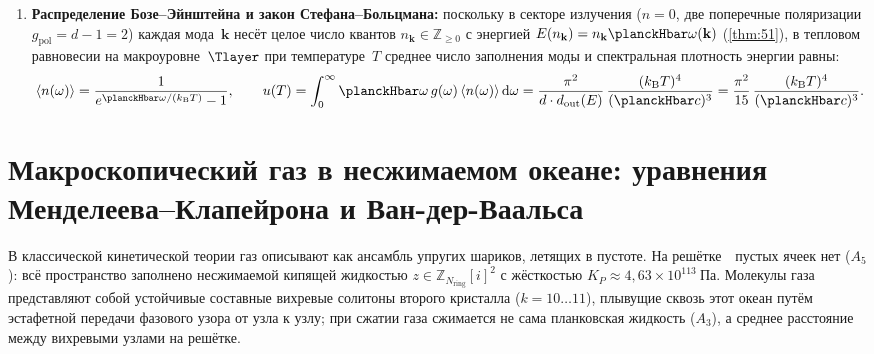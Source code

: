 \begin{theorem}
\begin{enumerate}[leftmargin=*]
  край зоны достигается \emph{в точности} при $\omega = \symPi/\htick$ и остаётся колеблющимся.
  Гиперболических мод ($|\cos\omega| > 1$) на этой звезде нет ни в одной точке зоны,
  что и снимает разгон, известный для декартовой сетки $\mathbb{Z}^d$ при $d>1$
  ().
\item \textbf{Распределение Бозе--Эйнштейна и закон Стефана--Больцмана:}
  поскольку в секторе излучения ($n=0$, две поперечные поляризации $g_{\mathrm{pol}} = d-1 = 2$) каждая мода~$\mathbf{k}$ несёт целое число квантов $n_{\mathbf{k}}\in\mathbb{Z}_{\ge 0}$ с энергией $E(n_{\mathbf{k}}) = n_{\mathbf{k}}\planckHbar\omega(\mathbf{k})$ (\cref{thm:51}), в тепловом равновесии на макроуровне~$\Tlayer$ при температуре~$T$ среднее число заполнения моды и спектральная плотность энергии равны:
  \[
    \langle n(\omega)\rangle = \frac{1}{e^{\planckHbar\omega/(k_{\mathrm{B}}T)} - 1},\qquad
    u(T) = \int_0^{\infty} \planckHbar\omega\,g(\omega)\,\langle n(\omega)\rangle\,\mathrm{d}\omega
    = \frac{\pi^2}{d\cdot d_{\mathrm{out}}(E)}\,\frac{(k_{\mathrm{B}}T)^4}{(\planckHbar c)^3}
    = \frac{\pi^2}{15}\,\frac{(k_{\mathrm{B}}T)^4}{(\planckHbar c)^3}.
  \]
\end{enumerate}
\end{theorem}

\section{Макроскопический газ в несжимаемом океане: уравнения Менделеева--Клапейрона и Ван-дер-Ваальса}
\label{sec:macro-gas-vdw}

В классической кинетической теории газ описывают как ансамбль упругих шариков, летящих в пустоте.
На решётке~\latGCKshort\ пустых ячеек нет ($A_5$): всё пространство заполнено несжимаемой кипящей жидкостью $z\in\mathbb{Z}_{N_{\mathrm{ring}}}[i]^2$ с жёсткостью $K_P \approx 4{,}63\times 10^{113}\ \mathrm{Па}$.
Молекулы газа представляют собой устойчивые составные вихревые солитоны второго кристалла ($k=10\ldots 11$), плывущие сквозь этот океан путём эстафетной передачи фазового узора от узла к узлу; при сжатии газа сжимается не сама планковская жидкость ($A_3$), а среднее расстояние между вихревыми узлами на решётке.

